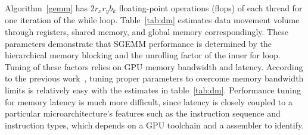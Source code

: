 
Algorithm~\ref{gemm} has $2 r_x r_y b_k$ floating-point operations (flops) of each thread for one iteration of the while loop.
Table~\ref{tab:dm} estimates data movement volume through registers, shared memory, and global 
memory correspondingly.
These parameters demonstrate that SGEMM performance is determined by the hierarchical memory blocking and the unrolling factor of the inner for loop.
Tuning of these factors relies on GPU memory bandwidth and latency. 
According to the previous work~\cite{magma,tan}, tuning proper parameters to overcome memory bandwidth limits is relatively easy with the estimates in table~\ref{tab:dm}.
Performance tuning for memory latency is much more difficult, since latency is closely coupled to a particular microarchitecture's features such as the instruction sequence and instruction types, which depends on a GPU toolchain and a assembler to identify. 


